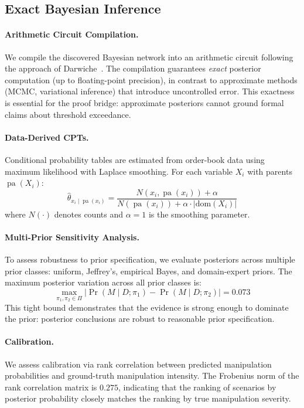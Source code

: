 \documentclass[11pt]{article}
\DeclareMathOperator{\Pr}{Pr}
\DeclareMathOperator{\pa}{pa}
\begin{document}
\subsection{Exact Bayesian Inference}
\label{sec:bayesian}

\paragraph{Arithmetic Circuit Compilation.}
We compile the discovered Bayesian network into an arithmetic circuit following the approach of Darwiche~\cite{darwiche2003}.
The compilation guarantees \emph{exact} posterior computation (up to floating-point precision), in contrast to approximate methods (MCMC, variational inference) that introduce uncontrolled error.
This exactness is essential for the proof bridge: approximate posteriors cannot ground formal claims about threshold exceedance.

\paragraph{Data-Derived CPTs.}
Conditional probability tables are estimated from order-book data using maximum likelihood with Laplace smoothing.
For each variable $X_i$ with parents $\pa(X_i)$:
\[
  \hat{\theta}_{x_i \mid \pa(x_i)} = \frac{N(x_i, \pa(x_i)) + \alpha}{N(\pa(x_i)) + \alpha \cdot |\text{dom}(X_i)|}
\]
where $N(\cdot)$ denotes counts and $\alpha = 1$ is the smoothing parameter.

\paragraph{Multi-Prior Sensitivity Analysis.}
\label{sec:sensitivity}
To assess robustness to prior specification, we evaluate posteriors across multiple prior classes: uniform, Jeffrey's, empirical Bayes, and domain-expert priors.
The maximum posterior variation across all prior classes is:
\[
  \max_{\pi_1, \pi_2 \in \Pi} |\Pr(M \mid D; \pi_1) - \Pr(M \mid D; \pi_2)| = 0.073
\]
This tight bound demonstrates that the evidence is strong enough to dominate the prior: posterior conclusions are robust to reasonable prior specification.

\paragraph{Calibration.}
We assess calibration via rank correlation between predicted manipulation probabilities and ground-truth manipulation intensity.
The Frobenius norm of the rank correlation matrix is $0.275$, indicating that the ranking of scenarios by posterior probability closely matches the ranking by true manipulation severity.
\end{document}
